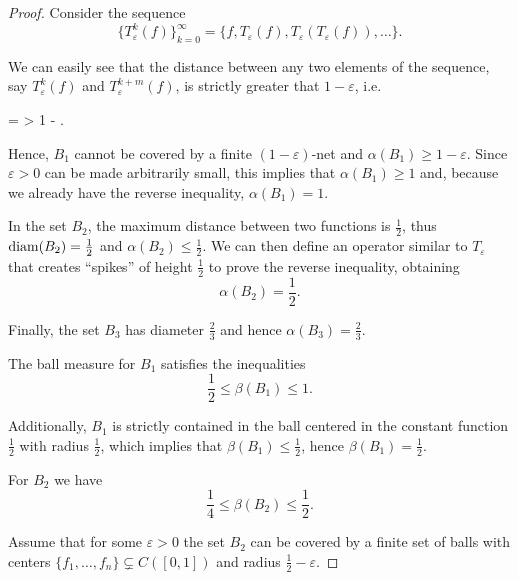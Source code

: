 \begin{proof}
  Consider the sequence
  \begin{equation*}
    \{ T_\varepsilon^k(f) \}_{k=0}^\infty = \{ f, T_\varepsilon(f), T_\varepsilon(T_\varepsilon(f)), \ldots \}.
  \end{equation*}

  We can easily see that the distance between any two elements of the sequence, say \( T_\varepsilon^k(f) \) and \( T_\varepsilon^{k+m}(f) \), is strictly greater that \( 1 - \varepsilon \), i.e.
  \begin{balign*}
    =
    >
    1 - \varepsilon.
  \end{balign*}

  Hence, \( B_1 \) cannot be covered by a finite \( (1-\varepsilon) \)-net and \( \alpha(B_1) \geq 1 - \varepsilon \). Since \( \varepsilon > 0 \) can be made arbitrarily small, this implies that \( \alpha(B_1) \geq 1 \) and, because we already have the reverse inequality, \( \alpha(B_1) = 1 \).

  In the set \( B_2 \), the maximum distance between two functions is \( \frac 1 2 \), thus \( \operatorname{diam}(B_2) = \frac 1 2 \) and \( \alpha(B_2) \leq \frac 1 2 \). We can then define an operator similar to \( T_\varepsilon \) that creates \enquote{spikes} of height \( \frac 1 2 \) to prove the reverse inequality, obtaining
  \begin{equation*}
    \alpha(B_2) = \frac 1 2.
  \end{equation*}

  Finally, the set \( B_3 \) has diameter \( \frac 2 3 \) and hence \( \alpha(B_3) = \frac 2 3 \).

  The ball measure for \( B_1 \) satisfies the inequalities
  \begin{equation*}
    \frac 1 2 \leq \beta(B_1) \leq 1.
  \end{equation*}

  Additionally, \( B_1 \) is strictly contained in the ball centered in the constant function \( \frac 1 2 \) with radius \( \frac 1 2 \), which implies that \( \beta(B_1) \leq \frac 1 2 \), hence \( \beta(B_1) = \frac 1 2 \).

  For \( B_2 \) we have
  \begin{equation*}
    \frac 1 4 \leq \beta(B_2) \leq \frac 1 2.
  \end{equation*}

  Assume that for some \( \varepsilon > 0 \) the set \( B_2 \) can be covered by a finite set of balls with centers \( \{ f_1, \ldots, f_n \} \subsetneq C([0, 1]) \) and radius \( \frac 1 2 - \varepsilon \).


\end{proof}

